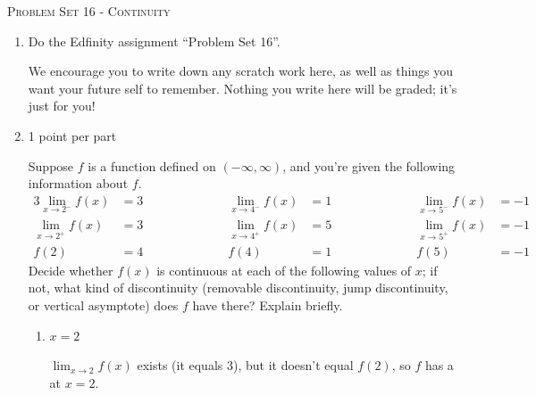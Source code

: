 \documentclass{article}
\newcommand{\doedfinity}[2][\newpage]{
  \begin{problem}[#1]
    Do the Edfinity assignment ``Problem Set #2''.

    We encourage you to write down any scratch work here, as well as
    things you want your future self to remember. Nothing you write
    here will be graded; it's just for you!
  \end{problem}
}
\begin{document}
\begin{center}
  \large\textsc{Problem Set 16 - Continuity}
\end{center}

\begin{enumerate}
\item  {}

  \doedfinity{16}

\item  \begin{grading}
    1 point per part
  \end{grading}

  Suppose $f$ is a function defined on $(-\infty, \infty)$, and you're given the following information about $f$.
  \begin{alignat*}{3}
    \lim_{x \to 2^-} f(x) &= 3 \hspace{1in} &
    \lim_{x \to 4^-} f(x) &= 1 \hspace{1in} &
    \lim_{x \to 5^-} f(x) &= -1 \\
    \lim_{x \to 2^+} f(x) &= 3 & \lim_{x \to 4^+} f(x) &= 5 & \lim_{x \to
      5^+} f(x) &= -1  \\
    f(2) &= 4 
    & f(4) &= 1 
    & f(5) &= -1 
  \end{alignat*}
  Decide whether $f(x)$ is continuous at each of the following values of $x$; if not, what kind of discontinuity (removable discontinuity, jump discontinuity, or vertical asymptote) does $f$ have there? Explain briefly.

  \begin{enumerate}
  \item
    \begin{problem}[0.5in]
      $x = 2$
    \end{problem}

    \begin{solution} %
      $\displaystyle \lim_{x \to 2} f(x)$ exists (it equals 3), but it doesn't equal $f(2)$, so $f$ has a  at $x = 2$.
    \end{solution}


\end{enumerate}
\end{enumerate}
\end{document}
